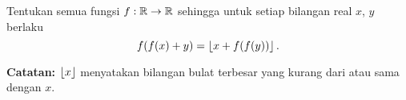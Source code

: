 Tentukan semua fungsi $f: \mathbb R \to \mathbb R$ sehingga untuk setiap bilangan real $x$, $y$ berlaku
    $$f(f(x)+y)=\left\lfloor x+f(f(y)) \right\rfloor.$$

\textbf{Catatan:} $\left\lfloor x \right\rfloor$ menyatakan bilangan bulat terbesar yang kurang dari atau sama dengan $x$.